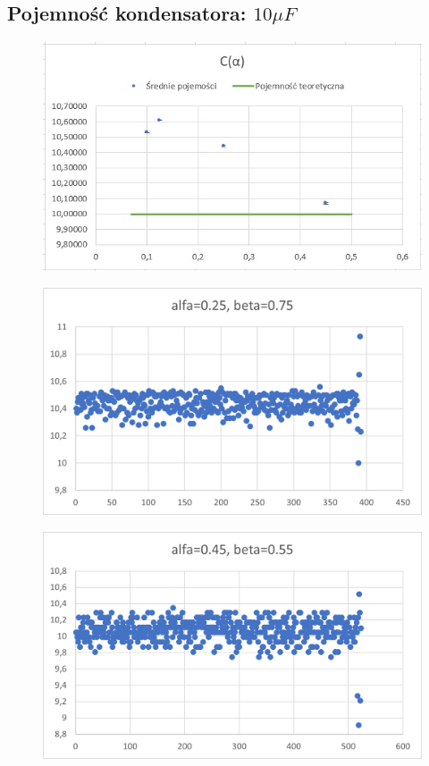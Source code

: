 \documentclass[12pt]{mwart}
\begin{document}
	\subsection{Pojemność kondensatora: $10 \mu F$}
	\begin{figure}[H]
		\centering
		\includegraphics{10_sr.jpg}
	\end{figure}
	\begin{figure}[H]
		\centering
		\includegraphics{10_a0.25.png}
	\end{figure}
	\begin{figure}[H]
		\centering
		\includegraphics{10_a0.45.png}
	\end{figure}
\end{document}
